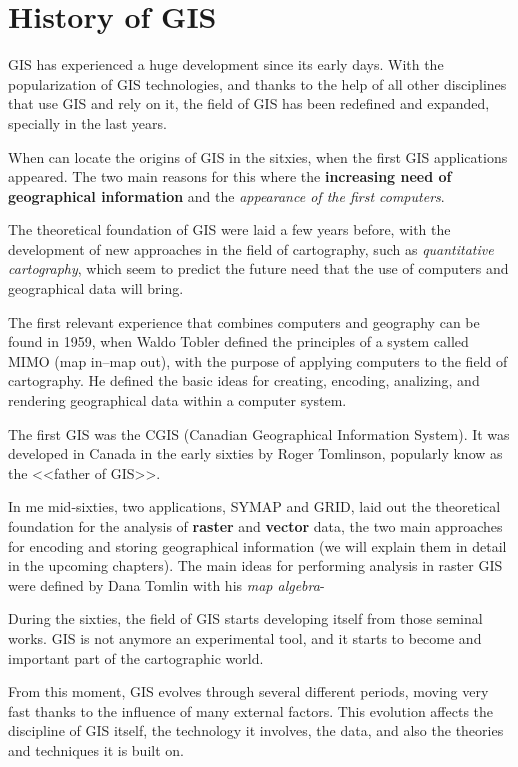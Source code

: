 
\chapter{History of GIS}


\pagestyle{fancy}

GIS has experienced a huge development since its early days. With the popularization of GIS technologies, and thanks to the help of all other disciplines that use GIS and rely on it, the field of GIS has been redefined and expanded, specially in the last years.

When can locate the origins of GIS in the sitxies, when the first GIS applications appeared. The two main reasons for this where the \textbf{increasing need of geographical information} and the \emph{appearance of the first computers}.

The theoretical foundation of GIS were laid a few years before, with the development of new approaches in the field of cartography, such as \emph{quantitative cartography}, which seem to predict the future need that the use of computers and geographical data will bring.

The first relevant experience that combines computers and geography can be found in 1959, when Waldo Tobler defined the principles of a system called MIMO (map in--map out), with the purpose of applying computers to the field of cartography. He defined the basic ideas for creating, encoding, analizing, and rendering geographical data within a computer system.

The first GIS was the CGIS (Canadian Geographical Information System). It was developed in Canada in the early sixties by Roger Tomlinson, popularly know as the <<father of GIS>>.

In me mid-sixties, two applications, SYMAP and GRID, laid out the theoretical foundation for the analysis of \textbf{raster} and \textbf{vector} data, the two main approaches for encoding and storing geographical information (we will explain them in detail in the upcoming chapters). The main ideas for performing analysis in raster GIS were defined by Dana Tomlin with his \emph{map algebra}-

During the sixties, the field of GIS starts developing itself from those seminal works. GIS is not anymore an experimental tool, and it starts to become and important part of the cartographic world.

From this moment, GIS evolves through several different periods, moving very fast thanks to the influence of many external factors. This evolution affects the discipline of GIS itself, the technology it involves, the data, and also the theories and techniques it is built on.



